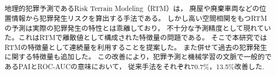 \usepackage{color}
\usepackage{url}
\usepackage{doi}
\usepackage{lmodern}
\usepackage{amsmath}
\usepackage{mathtools}
\usepackage{amsthm}
\usepackage{amssymb}
\usepackage{booktabs}
\usepackage[dvipdfmx]{graphicx}
\usepackage{listings}
\usepackage{float} 
\usepackage{placeins}
\usepackage[nameinlink]{cleveref}


\title{
}


\author{%
\and
{}
}



\begin{abstract}
地理的犯罪予測であるRisk Terrain Modeling（RTM）は，
廃屋や廃棄車両などの位置情報から犯罪発生リスクを算出する手法である。
しかし高い空間相関をもつRTMの予測は実際の犯罪発生の特性とは乖離しており，
不十分な予測精度として現れていた。これはRTMで離散値として構成された特徴量の問題である。
そこで本研究ではRTMの特徴量として連続量を利用することを提案した。
また併せて過去の犯罪発生に関する特徴量も追加した。
この改善により，犯罪予測と機械学習の文脈で一般的であるPAIとROC-AUCの意味において，
従来手法をそれぞれ70.7\%，13.5\%改善した. 
\end{abstract}

\def\Style{``jsaiac.sty''}
\def\BibTeX{{\rm B\kern-.05em{\sc i\kern-.025em b}\kern-.08em%
 T\kern-.1667em\lower.7ex\hbox{E}\kern-.125emX}}
\def\JBibTeX{\leavevmode\lower .6ex\hbox{J}\kern-0.15em\BibTeX}
\def\LaTeXe{\LaTeX\kern.15em2$_{\textstyle\varepsilon}$}


\maketitle

